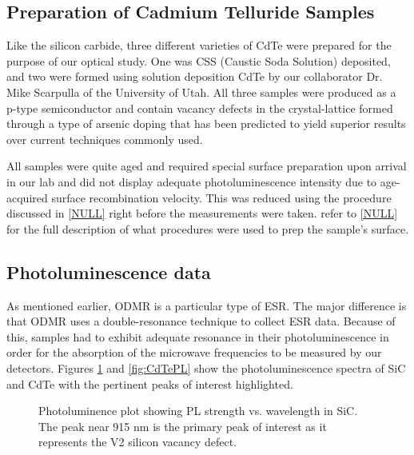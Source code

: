 \documentclass[oneside, astronomy, noacknowlegments]{BYUPhys}
\begin{document}
\subsection{Preparation of Cadmium Telluride Samples}

Like the silicon carbide, three different varieties of CdTe were prepared for the purpose of our optical study. One was CSS (Caustic Soda Solution) deposited, and two were formed using solution deposition CdTe by our collaborator Dr. Mike Scarpulla of the University of Utah. All three samples were produced as a p-type semiconductor and contain vacancy defects in the crystal-lattice formed through a type of arsenic doping that has been predicted to yield superior results over current techniques commonly used.  

All samples were quite aged and required special surface preparation upon arrival in our lab and did not display adequate photoluminescence intensity due to age-acquired surface recombination velocity. This was reduced using the procedure discussed in \ref{NULL} right before the measurements were taken. refer to \ref{NULL} for the full description of what procedures were used to prep the sample's surface.

\subsection{Photoluminescence data}

As mentioned earlier, ODMR is a particular type of ESR. The major difference is that ODMR uses a double-resonance technique to collect ESR data. Because of this, samples had to exhibit adequate resonance in their photoluminescence in order for the absorption of the microwave frequencies to be measured by our detectors. Figures \ref{fig:SiCPL} and \ref{fig:CdTePL} show the photoluminescence spectra of SiC and CdTe with the pertinent peaks of interest highlighted.

\begin{figure}
    \caption[Photoluminence Spectra of Silicon Carbide]{\label{fig:SiCPL}
      Photoluminence plot showing PL strength vs. wavelength in SiC. The peak near 915 nm is the primary peak of interest as it represents the V2 silicon vacancy defect.}
 \end{figure}
 
\end{document}
